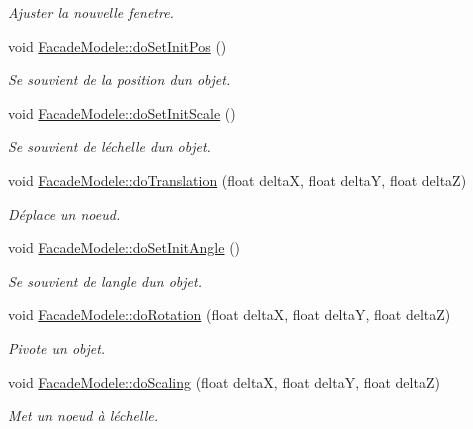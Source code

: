 \begin{DoxyCompactItemize}
\begin{DoxyCompactList}\small\item\em Ajuster la nouvelle fenetre. \end{DoxyCompactList}\item 
void \hyperlink{group__inf2990_gacbc609209644f410f7a576a8d1e509d0}{Facade\+Modele\+::do\+Set\+Init\+Pos} ()
\begin{DoxyCompactList}\small\item\em Se souvient de la position d\textquotesingle{}un objet. \end{DoxyCompactList}\item 
void \hyperlink{group__inf2990_gaccc885ec8fc20fa6709a2f74a609ce32}{Facade\+Modele\+::do\+Set\+Init\+Scale} ()
\begin{DoxyCompactList}\small\item\em Se souvient de l\textquotesingle{}échelle d\textquotesingle{}un objet. \end{DoxyCompactList}\item 
void \hyperlink{group__inf2990_ga3c29bb5fb742aacf7bea3f62357c4f48}{Facade\+Modele\+::do\+Translation} (float delta\+X, float delta\+Y, float delta\+Z)
\begin{DoxyCompactList}\small\item\em Déplace un noeud. \end{DoxyCompactList}\item 
void \hyperlink{group__inf2990_gadf7aee8a39d60a055bef3cd05cdda2db}{Facade\+Modele\+::do\+Set\+Init\+Angle} ()
\begin{DoxyCompactList}\small\item\em Se souvient de l\textquotesingle{}angle d\textquotesingle{}un objet. \end{DoxyCompactList}\item 
void \hyperlink{group__inf2990_ga51bb0f8d8e9a6c421ca688e83e10d670}{Facade\+Modele\+::do\+Rotation} (float delta\+X, float delta\+Y, float delta\+Z)
\begin{DoxyCompactList}\small\item\em Pivote un objet. \end{DoxyCompactList}\item 
void \hyperlink{group__inf2990_gac8decb6e4a3eabfa6baa89022aaab8eb}{Facade\+Modele\+::do\+Scaling} (float delta\+X, float delta\+Y, float delta\+Z)
\begin{DoxyCompactList}\small\item\em Met un noeud à l\textquotesingle{}échelle. \end{DoxyCompactList}\item 

\end{DoxyCompactItemize}
